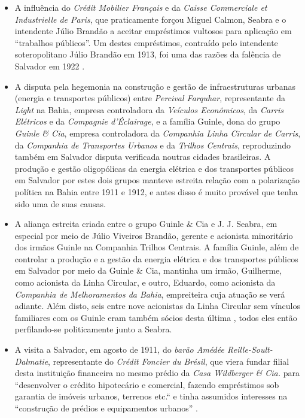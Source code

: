 \begin{itemize}
\item A influência do \textit{Crédit Mobilier Français} e da \textit{Caisse Commerciale et Industrielle de Paris}, que praticamente forçou Miguel Calmon, Seabra e o intendente Júlio Brandão a aceitar empréstimos vultosos para aplicação em ``trabalhos públicos''. Um destes empréstimos, contraído pelo intendente soteropolitano Júlio Brandão em 1913, foi uma das razões da falência de Salvador em 1922 \cite[pp.~119-122,~291]{CUNHA2011}.
\item A disputa pela hegemonia na construção e gestão de infraestruturas urbanas (energia e transportes públicos) entre \textit{Percival Farquhar}, representante da \textit{Light} na Bahia, empresa controladora da \textit{Veículos Econômicos}, da \textit{Carris Elétricos} e da \textit{Compagnie d'Éclairage}, e a família Guinle, dona do grupo \textit{Guinle \& Cia}, empresa controladora da \textit{Companhia Linha Circular de Carris}, da \textit{Companhia de Transportes Urbanos} e da \textit{Trilhos Centrais}, reproduzindo também em Salvador disputa verificada noutras cidades brasileiras. A produção e gestão oligopólicas da energia elétrica e dos transportes públicos em Salvador por estes dois grupos manteve estreita relação com a polarização política na Bahia entre 1911 e 1912, e antes disso é muito provável que tenha sido uma de suas causas.
\item A aliança estreita criada entre o grupo Guinle \& Cia e J. J. Seabra, em especial por meio de Júlio Viveiros Brandão, gerente e acionista minoritário dos irmãos Guinle na Companhia Trilhos Centrais. A família Guinle, além de controlar a produção e a gestão da energia elétrica e dos transportes públicos em Salvador por meio da Guinle \& Cia, mantinha um irmão, Guilherme, como acionista da Linha Circular, e outro, Eduardo, como acionista da \textit{Companhia de Melhoramentos da Bahia}, empreiteira cuja atuação se verá adiante. Além disto, seis entre nove acionistas da Linha Circular sem vínculos familiares com os Guinle eram também sócios desta última \cite[pp.~122]{CUNHA2011}, todos eles então perfilando-se politicamente junto a Seabra.
\item A visita a Salvador, em agosto de 1911, do \textit{barão Amédée Reille-Soult-Dalmatie}, representante do \textit{Crédit Foncier du Brésil}, que viera fundar filial desta instituição financeira no mesmo prédio da \textit{Casa Wildberger \& Cia.} para ``desenvolver o crédito hipotecário e comercial, fazendo empréstimos sob garantia de imóveis urbanos, terrenos etc.`` e tinha assumidos interesses na ``construção de prédios e equipamentos urbanos'' \cite[pp.~115-116]{CUNHA2011}.

\end{itemize}
